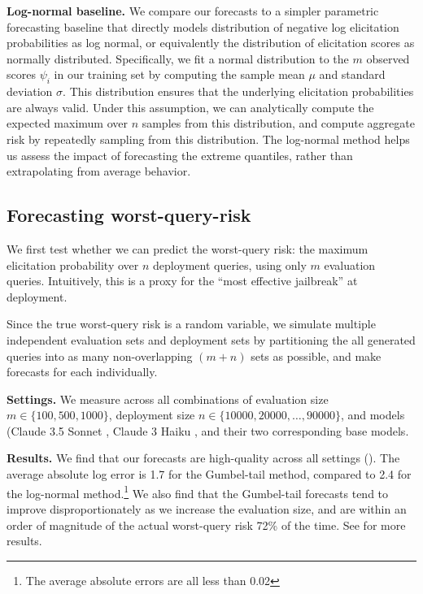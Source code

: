 \textbf{Log-normal baseline.} We compare our forecasts to a simpler parametric forecasting baseline that directly models distribution of negative log elicitation probabilities as log normal, or equivalently the distribution of elicitation scores as normally distributed. Specifically, we fit a normal distribution to the $m$ observed scores $\psi_i$ in our training set by computing the sample mean $\mu$ and standard deviation $\sigma$. This distribution ensures that the underlying elicitation probabilities are always valid. Under this assumption, we can analytically compute the expected maximum over $n$ samples from this distribution, and compute aggregate risk by repeatedly sampling from this distribution. The log-normal method helps us assess the impact of forecasting the extreme quantiles, rather than extrapolating from average behavior. 

\subsection{Forecasting worst-query-risk}
\label{sec:misuse-completion-wqr}

We first test whether we can predict the worst-query risk: the maximum elicitation probability over $n$ deployment queries, using only $m$ evaluation queries. Intuitively, this is a proxy for the ``most effective jailbreak'' at deployment.

Since the true worst-query risk is a random variable, we simulate multiple independent evaluation sets and deployment sets by partitioning the all generated queries into as many non-overlapping $(m + n)$ sets as possible, and make forecasts for each individually.

\textbf{Settings.} We measure across all combinations of evaluation size $m \in \{100, 500, 1000\}$, deployment size $n \in \{10000, 20000, \hdots, 90000\}$, and models (Claude 3.5 Sonnet \citep{claude3sonnet}, Claude 3 Haiku \citep{claude3haiku}, and their two corresponding base models.

\textbf{Results.} We find that our forecasts are high-quality across all settings (). The average absolute log error is 1.7 for the Gumbel-tail method, compared to 2.4 for the log-normal method.\footnote{The average absolute errors are all less than 0.02} 
We also find that the Gumbel-tail forecasts tend to improve disproportionately as we increase the evaluation size, and are within an order of magnitude of the actual worst-query risk 72\% of the time. 
See  for more results. 


